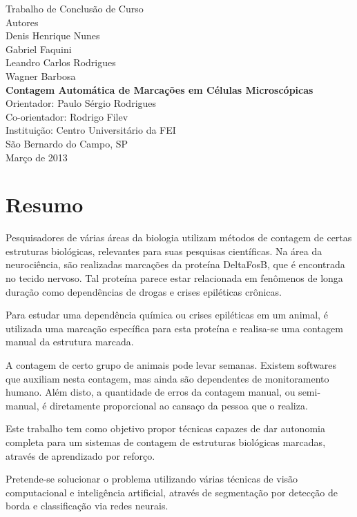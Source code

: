 \documentclass[a4,12pt]{paper}
\begin{document}
\thispagestyle{empty}
\begin{center}

\huge{Trabalho de Conclusão de Curso}\\[3 cm]

\large{Autores\\
Denis Henrique Nunes\\
Gabriel Faquini\\
Leandro Carlos Rodrigues\\
Wagner Barbosa
}\\[2 cm]


\huge{\textbf{Contagem Automática de Marcações em Células Microscópicas}}\\[4 cm]

\large{Orientador: Paulo Sérgio Rodrigues}\\
\large{Co-orientador: Rodrigo Filev}\\
\large{Instituição: Centro Universitário da FEI}\\[2 cm]


\large{São Bernardo do Campo, SP}\\
\large{Março de 2013}
\end{center}
\newpage

\pagestyle{empty}
\newpage

\pagestyle{headings}
\onehalfspacing

\section*{Resumo}

Pesquisadores de várias áreas da biologia utilizam métodos de contagem de certas estruturas biológicas, relevantes para suas pesquisas científicas. Na área da neurociência, são realizadas marcações da proteína DeltaFosB, que é encontrada no tecido nervoso. Tal proteína parece estar relacionada em fenômenos de longa duração como dependências de drogas e crises epiléticas crônicas.

Para estudar uma dependência química ou crises epiléticas em um animal, é utilizada uma marcação específica para esta proteína e realisa-se uma contagem manual da estrutura marcada.

A contagem de certo grupo de animais pode levar semanas. Existem softwares que auxiliam nesta contagem, mas ainda são dependentes de monitoramento humano. Além disto, a quantidade de erros da contagem manual, ou semi-manual, é diretamente proporcional ao cansaço da pessoa que o realiza.

Este trabalho tem como objetivo propor técnicas capazes de dar autonomia completa para um sistemas de contagem de estruturas biológicas marcadas, através de aprendizado por reforço.

Pretende-se solucionar o problema utilizando várias técnicas de visão computacional e inteligência artificial, através de segmentação por detecção de borda e classificação via redes neurais.
\end{document}
